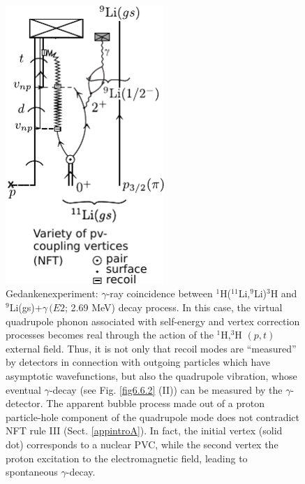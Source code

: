           \begin{figure}
          \centerline {
          \includegraphics*[width=6cm]{introduccion/figs/figintro6xxx}
          }
          \caption{Gedankenexperiment: $\gamma$-ray coincidence between  $^1$H($^{11}$Li,$^9$Li)$^3$H and $^9$Li(gs)+$\gamma\, (E2$; 2.69 MeV) decay process. In  this case, the virtual quadrupole phonon associated with self-energy and vertex correction processes becomes real through the action of the $^1$H,$^3$H $(p,t)$ external field. Thus, it is not only that recoil modes are ``measured'' by  detectors in connection with outgoing particles which have  asymptotic wavefunctions, but also the quadrupole vibration, whose eventual $\gamma$-decay (see Fig. \ref{fig6.6.2} (II)) can be  measured by the $\gamma$-detector. The apparent bubble process made out of a proton particle-hole component of the quadrupole mode does not contradict NFT rule III (Sect. \ref{appintroA}). In fact, the initial vertex (solid dot) corresponds to a nuclear PVC, while the second vertex the proton excitation to the electromagnetic field, leading to spontaneous $\gamma$-decay.}
          \label{figintro6x}
          \end{figure}
